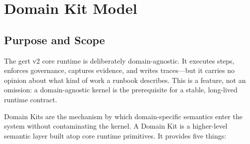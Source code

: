 
\chapter{Domain Kit Model}
\label{ch:domain-kits}

\section{Purpose and Scope}
\label{sec:kit-purpose}

The gert v2 core runtime is deliberately domain-agnostic.  It executes steps,
enforces governance, captures evidence, and writes traces---but it carries no
opinion about what kind of work a runbook describes.  This is a feature, not an
omission: a domain-agnostic kernel is the prerequisite for a stable, long-lived
runtime contract.

Domain Kits are the mechanism by which domain-specific semantics enter the
system without contaminating the kernel.  A Domain Kit is a higher-level
semantic layer built atop core runtime primitives.  It provides five things:

